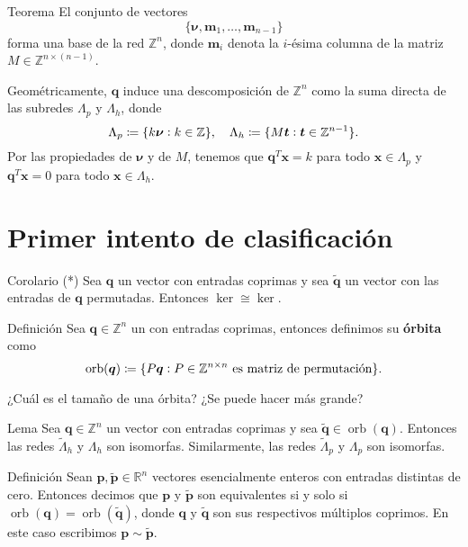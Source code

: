 \documentclass[aspectratio=169,professionalfonts]{beamer}
\newcommand{\Z}{\mathbb{Z}}
\newcommand{\R}{\mathbb{R}}
\renewcommand{\ker}[1]{\mathop{\mathrm{ker}{\left\lbrace #1 \right\rbrace}}}
\renewcommand{\vec}[1]{\boldsymbol{#1}}
\DeclareMathOperator{\orb}{orb}
\newcommand{\braces}[1]{\lbrace #1 \rbrace}
\newcommand{\tvec}[1]{\vec{\tilde{#1}}}
\begin{document}
\begin{frame}
	\begin{block}{Teorema}
		El conjunto de vectores
		\begin{equation*}
			\braces{\vec{\nu}, \vec{m}_1, \ldots, \vec{m}_{n-1}}
		\end{equation*}
		forma una base de la red $\Z^n$, donde $\vec{m}_i$ denota la $i$-ésima columna de
		la matriz $M \in \Z^{n \times (n-1)}$.
	\end{block}
	Geométricamente, $\vec{q}$ induce una descomposición de $\Z^n$
	como la suma directa de las subredes $\Lambda_p$ y $\Lambda_h$, donde
	\begin{equation*}
		\Lambda_p \coloneq \braces{k\vec{\nu} \vcentcolon k \in \Z}, \quad
		\Lambda_h \coloneq \braces{M\vec{t} \vcentcolon \vec{t} \in \Z^{n-1}}.
	\end{equation*}
	Por las propiedades de $\vec{\nu}$ y de $M$, tenemos que $\vec{q}^T\vec{x} =
	k$ para todo $\vec{x} \in \Lambda_p$ y $\vec{q}^T\vec{x} = 0$ para todo
	$\vec{x} \in \Lambda_h$.
\end{frame}

\section*{Primer intento de clasificación}
\begin{frame}
	\begin{block}{Corolario (*)}
		Sea $\vec{q}$ un vector con entradas coprimas y sea $\tvec{q}$ un vector con
		las entradas de $\vec{q}$ permutadas. Entonces $\ker{M^T} \cong
		\ker{\tilde{M}^T}$.
	\end{block}
	\begin{block}{Definición}
		Sea $\vec{q} \in \Z^n$ un con entradas coprimas, entonces definimos su
		\textbf{órbita} como
		\begin{equation*}
			\orb(\vec{q}) \coloneq \braces{P\vec{q} \vcentcolon P \in \Z^{n\times n} ~\text{es matriz de permutación}}.
		\end{equation*}
	\end{block}
	¿Cuál es el tamaño de una órbita? ¿Se puede hacer más grande?
\end{frame}

\begin{frame}
	\begin{block}{Lema}
		Sea $\vec{q} \in \Z^n$ un vector con entradas coprimas y sea $\tvec{q}
		\in \orb(\vec{q})$. Entonces las redes $\tilde{\Lambda}_h$ y $\Lambda_h$
		son isomorfas. Similarmente, las redes $\tilde{\Lambda}_p$ y $\Lambda_p$
		son isomorfas.
	\end{block}
	\begin{block}{Definición}
		Sean $\vec{p}, \tvec{p} \in \R^n$ vectores esencialmente enteros con
		entradas distintas de cero. Entonces decimos que $\vec{p}$ y $\tvec{p}$
		son equivalentes si y solo si $\orb(\vec{q}) = \orb(\tvec{q})$, donde
		$\vec{q}$ y $\tvec{q}$ son sus respectivos múltiplos coprimos. En este
		caso escribimos $\vec{p} \sim \tvec{p}$.
	\end{block}
\end{frame}
\end{document}
